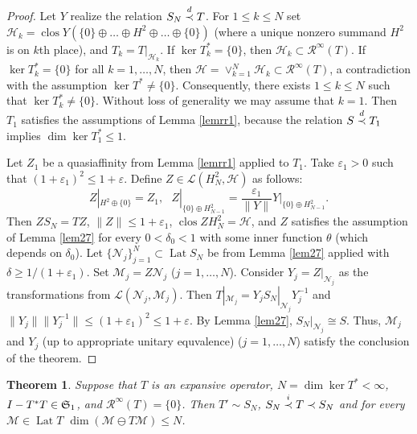 \documentclass[a4paper,oneside,11pt]{amsart}
\numberwithin{equation}{section}
\theoremstyle{plain}
\newtheorem{theorem}{Theorem}[section]
\theoremstyle{definition}
\begin{document}
\begin{proof} Let $Y$ realize the relation $S_N\buildrel d\over\prec T$. For $1\leq k\leq N$ 
set $\mathcal H_k=\operatorname{clos}Y(\{0\}\oplus \ldots \oplus H^2\oplus\ldots\oplus\{0\})$ (where a unique 
 nonzero summand $H^2$ is on $k$th place), and 
$T_k=T|_{\mathcal H_k}$. If $\ker T_k^*=\{0\}$,   then 
$\mathcal H_k\subset \mathcal R^\infty(T)$. If $\ker T_k^*=\{0\}$ for all $k=1,\ldots,N$, then 
$\mathcal H=\vee_{k=1}^N\mathcal H_k\subset\mathcal R^\infty(T)$, a contradiction with the assumption 
$\ker T^*\neq\{0\}$. 
 Consequently, there exists $1\leq k\leq N$ such that $\ker T_k^*\neq\{0\}$. Without loss of generality we may assume that $k=1$.
 Then $T_1$ satisfies the assumptions of Lemma \ref{lemrr1}, because
the relation $S\buildrel d\over\prec T_1$ implies $\dim\ker T_1^*\leq 1$. 

Let $Z_1$  be  a quasiaffinity from Lemma \ref{lemrr1} applied to $T_1$. 
Take $\varepsilon_1>0$ such that $(1+\varepsilon_1)^2\leq 1+\varepsilon$. 
 Define $Z\in\mathcal L(H^2_N, \mathcal H)$ as follows: 
\begin{equation*} Z|_{H^2\oplus\{0\}}=Z_1, \ \ \ Z|_{\{0\}\oplus H^2_{N-1}}=\frac{\varepsilon_1}{\|Y\|}Y|_{\{0\}\oplus H^2_{N-1}}.
\end{equation*}
Then $ZS_N=TZ$, $\|Z\|\leq1+\varepsilon_1$, $\operatorname{clos}ZH^2_N=\mathcal H$,  and $Z$ satisfies the assumption of Lemma \ref{lem27} 
for every $0<\delta_0<1$ with some inner function $\theta$ (which depends on $\delta_0$). Let  $\{\mathcal N_j\}_{j=1}^N\subset\operatorname{Lat}S_N$ be from Lemma \ref{lem27}
applied with  $\delta\geq 1/(1+\varepsilon_1)$. Set $\mathcal M_j=Z\mathcal N_j$ ($j=1,\ldots, N$). 
 Consider  $Y_j=Z|_{\mathcal N_j}$ as the transformations from 
 $\mathcal L(\mathcal N_j,\mathcal M_j)$. Then $T|_{\mathcal M_j}=Y_j S_N|_{\mathcal N_j}Y_j^{-1}$
 and 
 $\|Y_j\|\|Y_j^{-1}\|\leq (1+\varepsilon_1)^2\leq 1+\varepsilon$. By Lemma \ref{lem27},  $S_N|_{\mathcal N_j}\cong S$.  
Thus, $\mathcal M_j$ and $Y_j$ (up to appropriate unitary equvalence) ($j=1,\ldots, N$) satisfy the conclusion of the theorem.
\end{proof}


\begin{theorem}\label{thmmain1} Suppose that  $T$ is an expansive operator, 
  $N=\dim\ker T^*<\infty$, $I-T^*T\in\frak S_1$, and 
 $\mathcal R^\infty(T)=\{0\}$. Then $T'\sim S_N$, $S_N\buildrel i\over\prec T\prec S_N$ and for every $\mathcal M\in\operatorname{Lat}T$ 
$\dim( \mathcal M\ominus T\mathcal M)\leq N$.
\end{theorem}  
\end{document}
